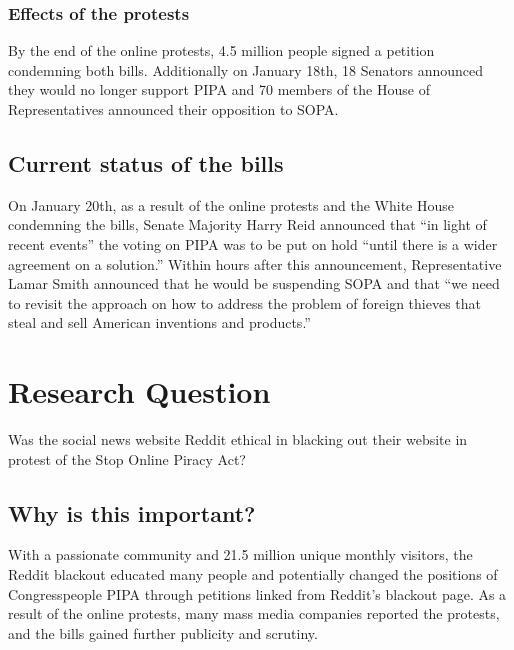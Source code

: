 \documentclass[11pt]{article}
\begin{document}
\begin{multicols}{2}
   \subsubsection{Effects of the protests}

By the end of the online protests, 4.5 million people signed a petition condemning both bills.\cite{protest-success} Additionally on January 18th, 18 Senators announced they would no longer support PIPA and 70 members of the House of Representatives announced their opposition to SOPA.\cite{senators-change-position}\cite{sopa-pipa-positions}

   \subsection{Current status of the bills}

On January 20th, as a result of the online protests and the White House condemning the bills, Senate Majority Harry Reid announced that ``in light of recent events'' the voting on PIPA was to be put on hold ``until there is a wider agreement on a solution.''\cite{delay-pipa}\cite{cnn-money-bills-postponed}\cite{delay-both} Within hours after this announcement, Representative Lamar Smith announced that he would be suspending SOPA and that ``we need to revisit the approach on how to address the problem of foreign thieves that steal and sell American inventions and products.''\cite{delay-sopa}\cite{delay-both}


   \section{Research Question}

Was the social news website Reddit ethical in blacking out their website in protest of the Stop Online Piracy Act?

   \subsection{Why is this important?}

With a passionate community and 21.5 million unique monthly visitors,\cite{how-reddit-works} the Reddit blackout educated many people and potentially changed the positions of Congresspeople PIPA through petitions linked from Reddit's blackout page. As a result of the online protests, many mass media companies reported the protests, and the bills gained further publicity and scrutiny.


\end{multicols}
\end{document}
